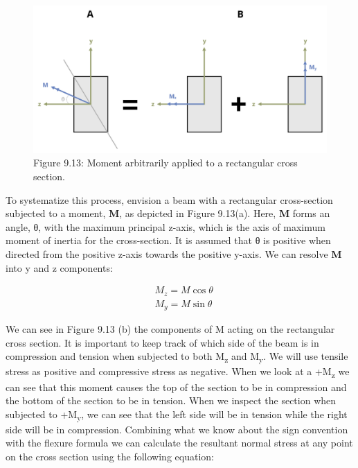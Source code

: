 \documentclass[
  letterpaper,
  DIV=11,
  numbers=noendperiod]{scrreprt}
\begin{document}
\begin{figure}[H]

{\centering \includegraphics{images/CH9 PNGs/Figure 9.13.png}

}

\caption{Figure 9.13: Moment arbitrarily applied to a rectangular cross
section.}

\end{figure}%

To systematize this process, envision a beam with a rectangular
cross-section subjected to a moment, \textbf{M}, as depicted in Figure
9.13(a). Here, \textbf{M} forms an angle, θ, with the maximum principal
z-axis, which is the axis of maximum moment of inertia for the
cross-section. It is assumed that θ is positive when directed from the
positive z-axis towards the positive y-axis. We can resolve \textbf{M}
into y and z components:

\[
\begin{aligned}
& M_z=M \cos \theta \\
& M_y=M \sin \theta
\end{aligned}
\]

We can see in Figure 9.13 (b) the components of M acting on the
rectangular cross section. It is important to keep track of which side
of the beam is in compression and tension when subjected to both
M\textsubscript{z} and M\textsubscript{y}. We will use tensile stress as
positive and compressive stress as negative. When we look at a
+M\textsubscript{z} we can see that this moment causes the top of the
section to be in compression and the bottom of the section to be in
tension. When we inspect the section when subjected to
+M\textsubscript{y}, we can see that the left side will be in tension
while the right side will be in compression. Combining what we know
about the sign convention with the flexure formula we can calculate the
resultant normal stress at any point on the cross section using the
following equation:
\end{document}
